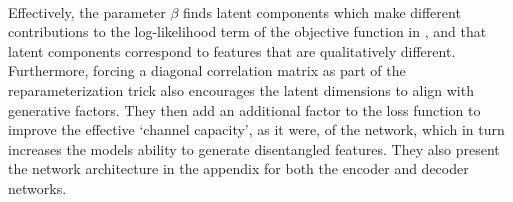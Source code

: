 \documentclass[justified,nobib]{tufte-handout}
\begin{document}
\begin{fullwidth}
\paragraph{} Effectively, the parameter $\beta$ finds latent components which make different contributions to the log-likelihood term of the objective function in \citep{ae}, and that latent components correspond to features that are qualitatively different. Furthermore, forcing a diagonal correlation matrix as part of the reparameterization trick also encourages the latent dimensions to align with generative factors. They then add an additional factor to the loss function to improve the effective `channel capacity', as it were, of the network, which in turn increases the models ability to generate disentangled features. They also present the network architecture in the appendix for both the encoder and decoder networks.    \\
\noindent\hrulefill
{}

\newpage


\end{fullwidth}
\end{document}
